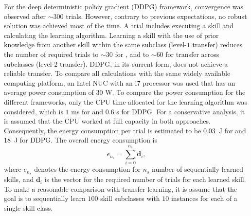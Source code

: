 For the deep deterministic policy gradient (DDPG) framework, convergence was observed after $\sim300$ trials.
However, contrary to previous expectations, no robust solution was achieved most of the time.
A trial includes executing a skill and calculating the learning algorithm.
Learning a skill with the use of prior knowledge from another skill within the same subclass (level-$1$ transfer) reduces the number of required trials to $\sim30$ for \skillmodelabbr{}, and to $\sim60$ for transfer across subclasses (level-$2$ transfer).
DDPG, in its current form, does not achieve a reliable transfer.
To compare all calculations with the same widely available computing platform, an Intel NUC with an i7 processor was used that has an average power consumption of $30$ W.
To compare the power consumption for the different frameworks, only the CPU time allocated for the learning algorithm was considered, which is $1$ ms for \skillmodelabbr{} and $0.6$ s for DDPG.
For a conservative analysis, it is assumed that the CPU worked at full capacity in both approaches.
Consequently, the energy consumption per trial is estimated to be $0.03$~J for \skillmodelabbr{} and $18$~J for DDPG.
The overall energy consumption is
\begin{equation}
    e_{n_s}=\sum_{i=0}^{n_s} \boldsymbol{d}_i,
\end{equation}
where $e_{n_s}$ denotes the energy consumption for $n_s$ number of sequentially learned skills, and $\boldsymbol{d}_i$ is the vector for the required number of trials for each learned skill.
To make a reasonable comparison with transfer learning, it is assume that the goal is to sequentially learn $100$ skill subclasses with $10$ instances for each of a single skill class.